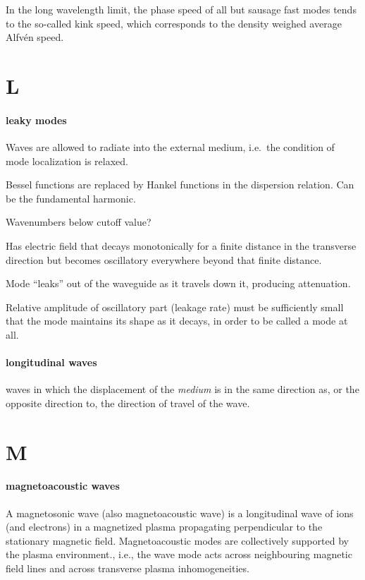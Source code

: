 \documentclass[12pt]{article}
\begin{document}
In the long wavelength limit, the phase speed of all but
sausage fast modes tends to the so-called kink speed,
which corresponds to the density weighed average Alfv\'en speed.

\section*{L}

\paragraph{leaky modes}
\begin{itemize*}
    \item Waves are allowed to radiate into the external medium,
        i.e.\ the condition of mode localization is relaxed.
    \item Bessel functions are replaced by Hankel functions in the
        dispersion relation. Can be the fundamental harmonic.
    \item Wavenumbers below cutoff value?
    \item Has electric field that decays monotonically for a finite
        distance in the transverse direction but becomes oscillatory
        everywhere beyond that finite distance.
    \item Mode ``leaks'' out of
        the waveguide as it travels down it, producing attenuation.
    \item Relative amplitude of oscillatory part (leakage rate)
        must be sufficiently small that the mode maintains its
        shape as it decays, in order to be called a mode at all.
\end{itemize*}

\paragraph{longitudinal waves}
waves in which the displacement of the \emph{medium} is in the
same direction as, or the opposite direction to,
the direction of travel of the wave.

\section*{M}
\paragraph{magnetoacoustic waves}
A magnetosonic wave (also magnetoacoustic wave) is a longitudinal wave
of ions (and electrons) in a magnetized plasma propagating perpendicular
to the stationary magnetic field.
Magnetoacoustic modes are collectively supported by the plasma
environment., i.e., the wave mode acts across neighbouring magnetic field
lines and across transverse plasma inhomogeneities.
\end{document}
